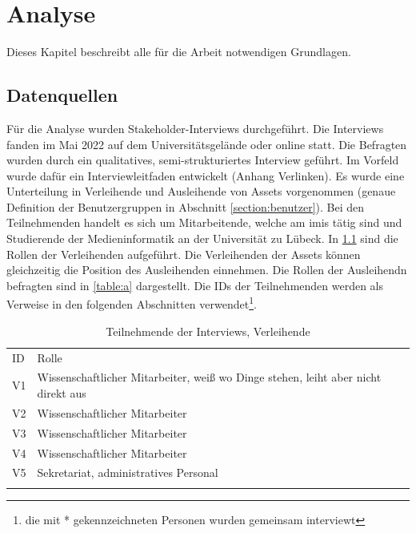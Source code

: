 
\chapter{Analyse}
\label{chapter-analyse}

Dieses Kapitel beschreibt alle für die Arbeit notwendigen Grundlagen.

\section{Datenquellen}
\label{section:daten}
Für die Analyse wurden Stakeholder-Interviews durchgeführt. Die Interviews fanden im Mai 2022
auf dem Universitätsgelände oder online statt. Die Befragten wurden durch ein qualitatives,
semi-strukturiertes Interview geführt. Im Vorfeld wurde dafür ein Interviewleitfaden entwickelt
(Anhang Verlinken). Es wurde eine Unterteilung in Verleihende und Ausleihende von Assets vorgenommen
(genaue Definition der Benutzergruppen in Abschnitt
\ref{section:benutzer}). Bei den Teilnehmenden handelt es sich um Mitarbeitende, welche am \ac{imis}
tätig sind und Studierende der Medieninformatik an der Universität zu Lübeck. In \ref{table:v} sind die Rollen der
Verleihenden aufgeführt. Die Verleihenden der Assets können gleichzeitig die Position des
Ausleihenden einnehmen. 
Die Rollen der Ausleihendn befragten sind in \ref{table:a} dargestellt. Die IDs
der Teilnehmenden werden als Verweise in den folgenden Abschnitten verwendet\footnote{die mit * gekennzeichneten Personen wurden gemeinsam interviewt}.


\begin{table}[h]
    \centering
    \caption{Teilnehmende der Interviews, Verleihende}
    \begin{tabular}{ll}
        \arrayrulecolor{maincolor}\hline
        \sffamily\color{maincolor}ID & \sffamily\color{maincolor}Rolle \\
        \arrayrulecolor{maincolor}\hline
            V1 & Wissenschaftlicher Mitarbeiter, weiß wo Dinge stehen, leiht aber nicht direkt aus\\
            V2 & Wissenschaftlicher Mitarbeiter\\
            V3 & Wissenschaftlicher Mitarbeiter\\
            V4 & Wissenschaftlicher Mitarbeiter\\
            V5 & Sekretariat, administratives Personal\\
            \arrayrulecolor{maincolor}\hline
    \end{tabular}  
    \label{table:v}
\end{table}

